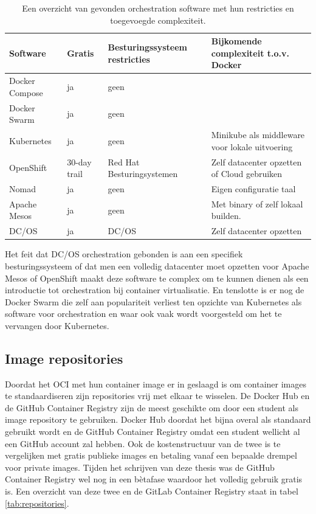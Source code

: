 \begin{center}
    \begin{table}
        \begin{tabular}{ m{3cm} || m{1.5cm} | m{3.3cm} | m{4.5cm} }
            Software & Gratis & Besturingssysteem restricties & Bijkomende complexiteit t.o.v. Docker \\ 
            \hline
            Docker Compose & ja & geen &  \\  
            \hline
            Docker Swarm & ja & geen & \\
            \hline 
            Kubernetes & ja & geen & Minikube als middleware voor lokale uitvoering \\
            \hline
            OpenShift & 30-day trail & Red Hat Besturingsystemen & Zelf datacenter opzetten of Cloud gebruiken \\
            \hline
            Nomad & ja & geen & Eigen configuratie taal \\
            \hline
            Apache Mesos & ja & geen & Met binary of zelf lokaal builden.  \\
            \hline 
            DC/OS & ja & DC/OS & Zelf datacenter opzetten \\
        \end{tabular}
        \caption[Overzicht orchestration]{Een overzicht van gevonden orchestration software met hun restricties en toegevoegde complexiteit.}
        \label{tab:Ochestration}
    \end{table}
\end{center}

Het feit dat DC/OS orchestration gebonden is aan een specifiek besturingssysteem of dat men een volledig datacenter moet opzetten voor Apache Mesos of OpenShift maakt deze software te complex om te kunnen dienen als een introductie tot orchestration bij container virtualisatie. En tenslotte is er nog de Docker Swarm die zelf aan populariteit verliest ten opzichte van Kubernetes als software voor orchestration en waar ook vaak wordt voorgesteld om het te vervangen door Kubernetes.


\subsection{Image repositories}
Doordat het OCI met hun container image er in geslaagd is om container images te standaardiseren zijn repositories vrij met elkaar te wisselen. De Docker Hub en de GitHub Container Registry zijn de meest geschikte om door een student als image repository te gebruiken. Docker Hub doordat het bijna overal als standaard gebruikt wordt en de GitHub Container Registry omdat een student wellicht al een GitHub account zal hebben. Ook de kostenstructuur van de twee is te vergelijken met gratis publieke images en betaling vanaf een bepaalde drempel voor private images. Tijden het schrijven van deze thesis was de GitHub Container Registry wel nog in een bètafase waardoor het volledig gebruik gratis is. Een overzicht van deze twee en de GitLab Container Registry staat in tabel \ref{tab:repositories}.

